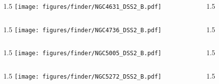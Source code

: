 \documentclass[final]{beamer}
\newlength{\colwidth}
\begin{document}

\begin{frame}[t]{}
  \begin{columns}[T]
    \begin{column}{1.5\colwidth}
      \centering
      \texttt{[image: figures/finder/NGC4631\_DSS2\_B.pdf]}
    \end{column}
    \begin{column}{1.5\colwidth}
      \Large
      
    \end{column}
  \end{columns}
  \vspace{\fill}
  \begin{columns}[T]
    \begin{column}{1.5\colwidth}
      \centering
      \texttt{[image: figures/finder/NGC4736\_DSS2\_B.pdf]}
    \end{column}
    \begin{column}{1.5\colwidth}
      \Large
      
    \end{column}
  \end{columns}
\end{frame}


\begin{frame}[t]{}
  \begin{columns}[T]
    \begin{column}{1.5\colwidth}
      \centering
      \texttt{[image: figures/finder/NGC5005\_DSS2\_B.pdf]}
    \end{column}
    \begin{column}{1.5\colwidth}
      \Large
      
    \end{column}
  \end{columns}
  \vspace{\fill}
  \begin{columns}[T]
    \begin{column}{1.5\colwidth}
      \centering
      \texttt{[image: figures/finder/NGC5272\_DSS2\_B.pdf]}
    \end{column}
    \begin{column}{1.5\colwidth}
      \Large
      
    \end{column}
  \end{columns}
  \end{frame}
\end{document}
